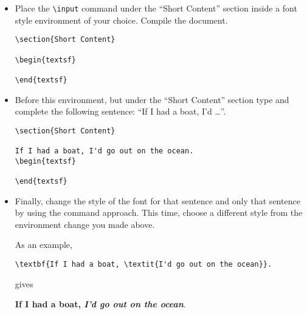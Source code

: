 \begin{itemize}

\item Place the \texttt{\textbackslash{}input} command under the ``Short Content''
  section inside a font style environment of your choice. Compile the
  document.

  \begin{lstlisting}
\section{Short Content}

\begin{textsf}
  
\end{textsf}
  \end{lstlisting}

\item Before this environment, but under the ``Short Content'' section type and
  complete the following sentence: ``If I had a boat, I'd \ldots''.

  \begin{lstlisting}
\section{Short Content}

If I had a boat, I'd go out on the ocean.
\begin{textsf}
  
\end{textsf}
  \end{lstlisting}

\item Finally, change the style of the font for that sentence and only that
  sentence by using the command approach. This time, choose a different style
  from the environment change you made above.

  As an example,

  \begin{lstlisting}
\textbf{If I had a boat, \textit{I'd go out on the ocean}}.
  \end{lstlisting}

  gives

  \begin{center}
    \begin{minipage}{.5\linewidth}
      \begin{framed}
        \textbf{If I had a boat, \textit{I'd go out on the ocean}}.
      \end{framed}
    \end{minipage}
  \end{center}

\end{itemize}


